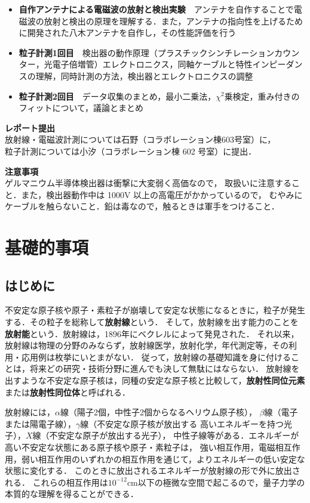 \documentclass[a4j,10pt,oneside,openany]{jsbook}
\begin{document}
\begin{description}
\begin{itemize}
    \item {\bf 自作アンテナによる電磁波の放射と検出実験}~~アンテナを自作することで電磁波の放射と検出の原理を理解する．また，アンテナの指向性を上げるために開発された八木アンテナを自作し，その性能評価を行う
    \item {\bf 粒子計測1回目}~~検出器の動作原理（プラスチックシンチレーションカウンター，光電子倍増管）エレクトロニクス，同軸ケーブルと特性インピーダンスの理解，同時計測の方法，検出器とエレクトロニクスの調整
    \item {\bf 粒子計測2回目}~~データ収集のまとめ，最小二乗法，$\chi^2$乗検定，重み付きのフィットについて，議論とまとめ
  \end{itemize}
  \item {\bf レポート提出}\\
  放射線・電磁波計測については石野（コラボレーション棟603号室）に，\\
  粒子計測については小汐（コラボレーション棟 602 号室）に提出．
  \item {\bf 注意事項}\\
  ゲルマニウム半導体検出器は衝撃に大変弱く高価なので， 取扱いに注意すること．また，検出器動作中は 1000V 以上の高電圧がかかっているので， むやみにケーブルを触らないこと．鉛は毒なので，触るときは軍手をつけること．
\end{description}

\section{基礎的事項}\label{sec:basic}
\subsection{はじめに}
不安定な原子核や原子・素粒子が崩壊して安定な状態になるときに，粒子が発生する．その粒子を総称して{\bf 放射線}という．
そして，放射線を出す能力のことを{\bf 放射能}という．放射線は，1896年にベクレルによって発見された．
それ以来，放射線は物理の分野のみならず，放射線医学，放射化学，年代測定等，その利用・応用例は枚挙にいとまがない．
従って，放射線の基礎知識を身に付けることは，将来どの研究・技術分野に進んでも決して無駄にはならない．
放射線を出すような不安定な原子核は，同種の安定な原子核と比較して，{\bf 放射性同位元素}または{\bf 放射性同位体}と呼ばれる．

放射線には，$\alpha$線（陽子2個，中性子2個からなるヘリウム原子核），
$\beta$線（電子または陽電子線），$\gamma$線（不安定な原子核が放出する
高いエネルギーを持つ光子），$X$線（不安定な原子が放出する光子），
中性子線等がある．エネルギーが高い不安定な状態にある原子核や原子・素粒子は，
強い相互作用，電磁相互作用，弱い相互作用のいずれかの相互作用を通じて，よりエネルギーの低い安定な状態に変化する．
このときに放出されるエネルギーが放射線の形で外に放出される．
これらの相互作用は$10^{-12}$cm以下の極微な空間で起こるので，量子力学の本質的な理解を得ることができる．
\end{document}
